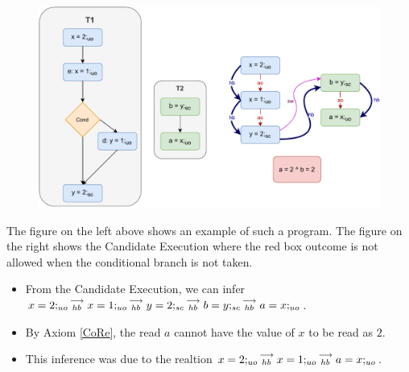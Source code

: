             \begin{figure}
                \centering 
                \includegraphics[scale=0.7]{InstructionReordering/CounterExamples2a(Conditionals).pdf}
                \caption{}
            \end{figure}
            The figure on the left above shows an example of such a program.  
            The figure on the right shows the Candidate Execution where the red box outcome is not allowed when the conditional branch is not taken.
            \begin{itemize}
                \item From the Candidate Execution, we can infer $x=2;_{uo}\stackrel{\longrightarrow}{_{hb}}x=1;_{uo}\stackrel{\longrightarrow}{_{hb}}y=2;_{sc}\stackrel{\longrightarrow}{_{hb}}b=y;_{sc}\stackrel{\longrightarrow}{_{hb}}a=x;_{uo}$.
                \item By Axiom \ref{CoRe}, the read $a$ cannot have the value of $x$ to be read as $2$.  
                \item This inference was due to the realtion $x=2;_{uo}\stackrel{\longrightarrow}{_{hb}}x=1;_{uo}\stackrel{\longrightarrow}{_{hb}}a=x;_{uo}$.
            \end{itemize}

